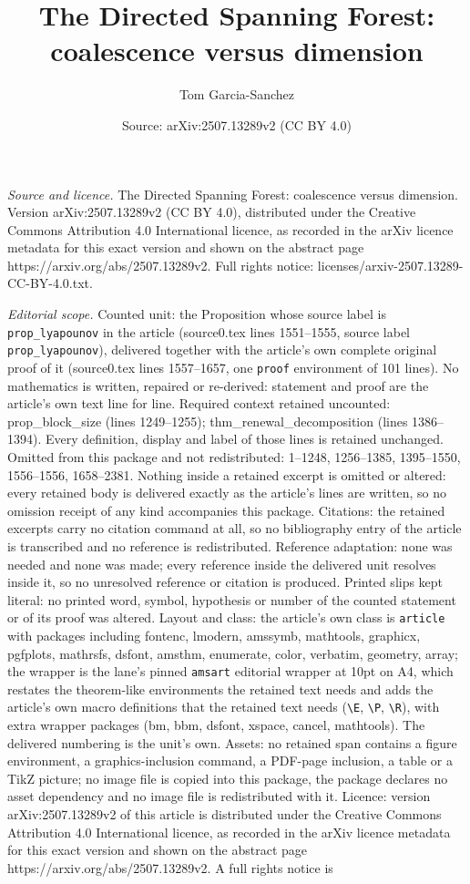 \documentclass[10pt,a4paper]{amsart}
\title[The Directed Spanning Forest: coalescence versus dimension]{The Directed Spanning Forest: coalescence versus dimension}
\author{Tom Garcia-Sanchez}
\date{Source: arXiv:2507.13289v2 (CC BY 4.0)}
\begin{document}
\maketitle

\noindent\emph{Source and licence.} The Directed Spanning Forest: coalescence versus dimension. Version arXiv:2507.13289v2 (CC BY 4.0), distributed under the Creative Commons Attribution 4.0 International licence, as recorded in the arXiv licence metadata for this exact version and shown on the abstract page https://arxiv.org/abs/2507.13289v2. Full rights notice: licenses/arxiv-2507.13289-CC-BY-4.0.txt.\par\smallskip

\noindent\textit{Editorial scope.} Counted unit: the Proposition whose source label is \texttt{prop\_lyapounov} in the article (source0.tex lines 1551--1555, source label \texttt{prop\_lyapounov}), delivered together with the article's own complete original proof of it (source0.tex lines 1557--1657, one \texttt{proof} environment of 101 lines). No mathematics is written, repaired or re-derived: statement and proof are the article's own text line for line. Required context retained uncounted: prop\_block\_size (lines 1249--1255); thm\_renewal\_decomposition (lines 1386--1394). Every definition, display and label of those lines is retained unchanged. Omitted from this package and not redistributed: 1--1248, 1256--1385, 1395--1550, 1556--1556, 1658--2381. Nothing inside a retained excerpt is omitted or altered: every retained body is delivered exactly as the article's lines are written, so no omission receipt of any kind accompanies this package. Citations: the retained excerpts carry no citation command at all, so no bibliography entry of the article is transcribed and no reference is redistributed. Reference adaptation: none was needed and none was made; every reference inside the delivered unit resolves inside it, so no unresolved reference or citation is produced. Printed slips kept literal: no printed word, symbol, hypothesis or number of the counted statement or of its proof was altered. Layout and class: the article's own class is \texttt{article} with packages including fontenc, lmodern, amssymb, mathtools, graphicx, pgfplots, mathrsfs, dsfont, amsthm, enumerate, color, verbatim, geometry, array; the wrapper is the lane's pinned \texttt{amsart} editorial wrapper at 10pt on A4, which restates the theorem-like environments the retained text needs and adds the article's own macro definitions that the retained text needs (\texttt{\textbackslash E}, \texttt{\textbackslash P}, \texttt{\textbackslash R}), with extra wrapper packages (bm, bbm, dsfont, xspace, cancel, mathtools). The delivered numbering is the unit's own. Assets: no retained span contains a figure environment, a graphics-inclusion command, a PDF-page inclusion, a table or a TikZ picture; no image file is copied into this package, the package declares no asset dependency and no image file is redistributed with it. Licence: version arXiv:2507.13289v2 of this article is distributed under the Creative Commons Attribution 4.0 International licence, as recorded in the arXiv licence metadata for this exact version and shown on the abstract page https://arxiv.org/abs/2507.13289v2. A full rights notice is 
\end{document}
